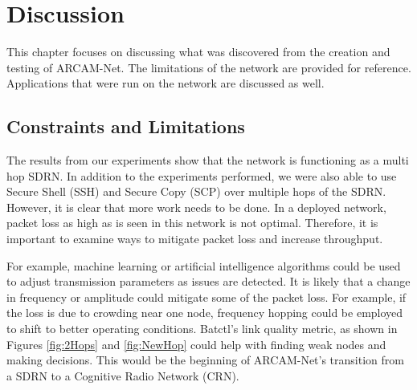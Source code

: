 
\chapter{Discussion} %

\label{Chapter5} %



This chapter focuses on discussing what was discovered from the creation and testing of ARCAM-Net. The limitations of the network are provided for reference. Applications that were run on the network are discussed as well. 

\section{Constraints and Limitations}



The results from our experiments show that the network is functioning as a multi hop SDRN. In addition to the experiments performed, we were also able to use Secure Shell (SSH) and Secure Copy (SCP) over multiple hops of the SDRN. However, it is clear that more work needs to be done. In a deployed network, packet loss as high as is seen in this network is not optimal. Therefore, it is important to examine ways to mitigate packet loss and increase throughput. 

For example, machine learning or artificial intelligence algorithms could be used to adjust transmission parameters as issues are detected. It is likely that a change in frequency or amplitude could mitigate some of the packet loss. For example, if the loss is due to crowding near one node, frequency hopping could be employed to shift to better operating conditions. Batctl's link quality metric, as shown in Figures \ref{fig:2Hops} and \ref{fig:NewHop} could help with finding weak nodes and making decisions. This would be the beginning of ARCAM-Net's transition from a SDRN to a Cognitive Radio Network (CRN). 

